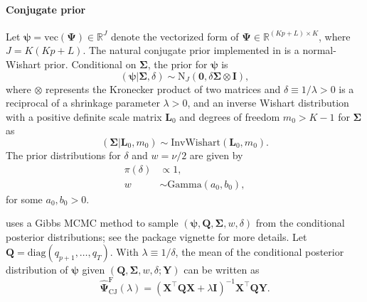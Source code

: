 \paragraph{Conjugate prior}\label{conjugate-prior}

Let \(\boldsymbol\psi = \text{vec}(\boldsymbol\Psi) \in\mathbb{R}^{J}\) denote
the vectorized form of \(\boldsymbol\Psi \in\mathbb{R}^{(Kp + L)\times K}\), where
\(J = K (Kp + L)\).
The natural conjugate prior implemented in  is a
normal-Wishart prior. Conditional on \(\mathbf{\Sigma}\), the
prior for \(\boldsymbol\psi\) is
\begin{equation}
  ( \boldsymbol\psi | \mathbf{\Sigma}, \delta )  
  \sim \text{N}_{J} \left( \mathbf{0}, \delta \mathbf{\Sigma} \otimes \mathbf{I} \right),
\end{equation}
where \(\otimes\) represents the Kronecker product of two matrices and \(\delta \equiv 1 / \lambda > 0\) is a reciprocal of a shrinkage parameter \(\lambda > 0\),
and an inverse Wishart distribution with a positive definite scale matrix \(\mathbf{L}_0\) and degrees of freedom \(m_0 > K - 1\) for \(\mathbf{\Sigma}\) as
\begin{equation}
  ( \mathbf{\Sigma} | \mathbf{L}_0, m_0 )
  \sim \text{InvWishart}\left(\mathbf{L}_0, m_0\right).
\end{equation}
The prior distributions for \(\delta\) and \(w = \nu / 2\) are given by
\begin{equation}
  \begin{split}
  \pi(\delta) & \propto 1, \\
  w & \sim \text{Gamma}(a_0, b_0),
  \end{split}
\end{equation}
for some \(a_0, b_0 > 0\).

 uses a Gibbs MCMC method to sample
\((\boldsymbol\psi, \mathbf{Q}, \mathbf{\Sigma}, w, \delta)\)
from the conditional posterior distributions;
see the package vignette for more details.
Let \(\mathbf{Q} = \text{diag}(q_{p+1}, \ldots, q_T)\).
With \(\lambda \equiv 1 / \delta\), the mean of the conditional posterior distribution of \(\boldsymbol\psi\) given \((\mathbf{Q}, \mathbf{\Sigma}, w, \delta ; \mathbf{Y} )\) can be written as
\begin{equation}
  \widehat{\mathbf\Psi}^\text{F}_\text{CJ}( \lambda ) 
  =  \left( \mathbf{X}^\top \mathbf{Q} \mathbf{X} + \lambda \mathbf{I} \right)^{-1} \mathbf{X}^\top \mathbf{Q} \mathbf{Y}.
  \label{eq:expr-fbayes-cj-psihat}
\end{equation}

